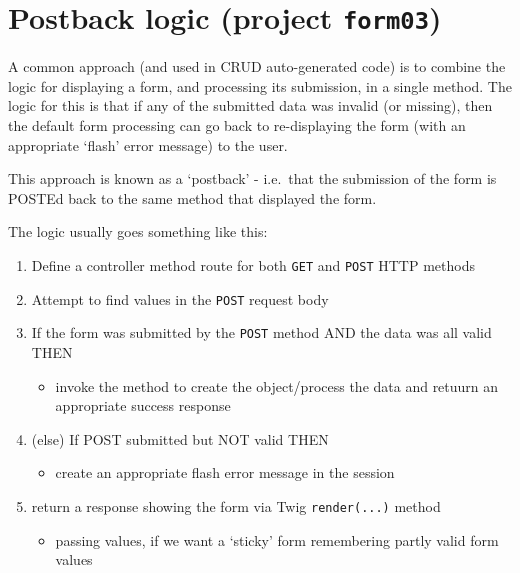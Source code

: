 \documentclass[a4paperpaper,openright]{book}
\providecommand{\tightlist}{%
  \setlength{\itemsep}{0pt}\setlength{\parskip}{0pt}}
\begin{document}
\hypertarget{postback-logic-project-form03}{%
\section{\texorpdfstring{Postback logic (project
\texttt{form03})}{Postback logic (project form03)}}\label{postback-logic-project-form03}}

A common approach (and used in CRUD auto-generated code) is to combine
the logic for displaying a form, and processing its submission, in a
single method. The logic for this is that if any of the submitted data
was invalid (or missing), then the default form processing can go back
to re-displaying the form (with an appropriate `flash' error message) to
the user.

This approach is known as a `postback' - i.e.~that the submission of the
form is POSTEd back to the same method that displayed the form.

The logic usually goes something like this:

\begin{enumerate}
\def\labelenumi{\arabic{enumi}.}
\item
  Define a controller method route for both \texttt{GET} and
  \texttt{POST} HTTP methods
\item
  Attempt to find values in the \texttt{POST} request body
\item
  If the form was submitted by the \texttt{POST} method AND the data was
  all valid THEN

  \begin{itemize}
  \tightlist
  \item
    invoke the method to create the object/process the data and retuurn
    an appropriate success response
  \end{itemize}
\item
  (else) If POST submitted but NOT valid THEN

  \begin{itemize}
  \tightlist
  \item
    create an appropriate flash error message in the session
  \end{itemize}
\item
  return a response showing the form via Twig \texttt{render(...)}
  method

  \begin{itemize}
  \tightlist
  \item
    passing values, if we want a `sticky' form remembering partly valid
    form values
  \end{itemize}
\end{enumerate}
\end{document}

